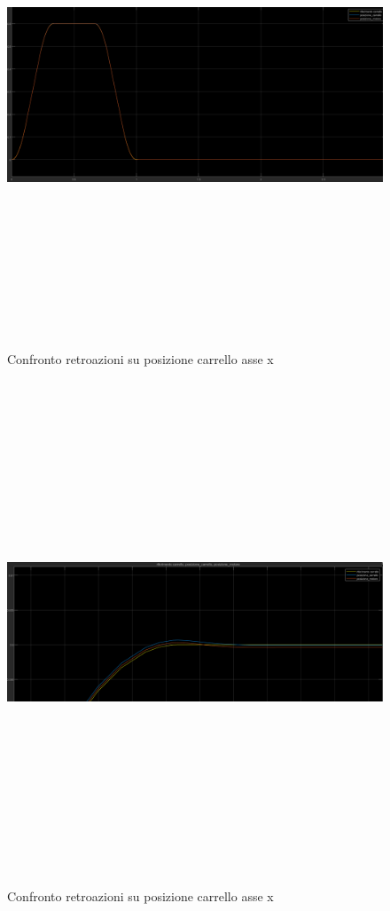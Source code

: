 \documentclass{article}
\begin{document}
\begin{figure}[H]
\centering
\includegraphics[width=13cm,height=15cm,keepaspectratio]{./simulink/ldm_rigido/PIDX_POSIZIONE}
\caption{Confronto retroazioni su posizione carrello asse x}
\end{figure}

\begin{figure}[H]
\centering
\includegraphics[width=13cm,height=15cm,keepaspectratio]{./simulink/ldm_rigido/PIDX_POSIZIONEZOOM}
\caption{Confronto retroazioni su posizione carrello asse x}
\end{figure}
\end{document}
